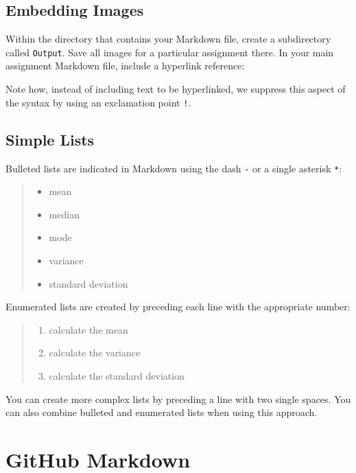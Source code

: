 \documentclass[]{book}
\providecommand{\tightlist}{%
  \setlength{\itemsep}{0pt}\setlength{\parskip}{0pt}}
\theoremstyle{definition}
\theoremstyle{definition}
\theoremstyle{definition}
\theoremstyle{remark}
\begin{document}
\subsection{Embedding Images}\label{embedding-images}

Within the directory that contains your Markdown file, create a
subdirectory called \texttt{Output}. Save all images for a particular
assignment there. In your main assignment Markdown file, include a
hyperlink reference:

Note how, instead of including text to be hyperlinked, we suppress this
aspect of the syntax by using an exclamation point \texttt{!}.

\subsection{Simple Lists}\label{simple-lists}

Bulleted lists are indicated in Markdown using the dash \texttt{-} or a
single asterisk \texttt{*}:

\begin{quote}
\begin{itemize}
\tightlist
\item
  mean
\item
  median
\item
  mode
\item
  variance
\item
  standard deviation
\end{itemize}
\end{quote}

Enumerated lists are created by preceding each line with the appropriate
number:

\begin{quote}
\begin{enumerate}
\def\labelenumi{\arabic{enumi}.}
\tightlist
\item
  calculate the mean
\item
  calculate the variance
\item
  calculate the standard deviation
\end{enumerate}
\end{quote}

You can create more complex lists by preceding a line with two single
spaces. You can also combine bulleted and enumerated lists when using
this approach.

\section{GitHub Markdown}\label{github-markdown}
\end{document}
